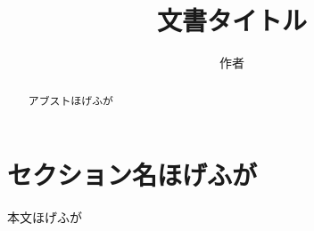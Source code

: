 \documentclass[
  paper=a4,
]{jlreq}
\title{文書タイトル}
\author{作者}
\date{\empty}
\begin{document}
\maketitle

\begin{abstract}
  アブストほげふが
\end{abstract}

\section{セクション名ほげふが}

本文ほげふが
\end{document}
